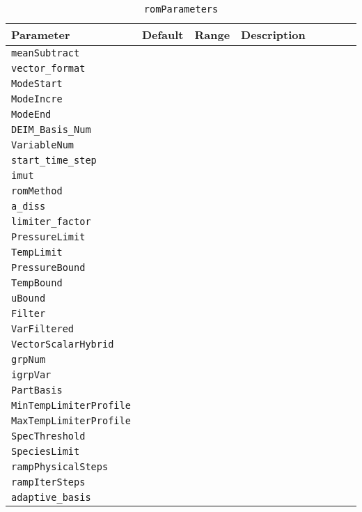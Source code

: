 \begin{table}[H]
    \centering
    \begin{tabular}{p{0.2\linewidth} p{0.1\linewidth} p{0.1\linewidth} p{0.6\linewidth}}
        \toprule
        Parameter & Default & Range & Description \\
        \midrule
        \verb|meanSubtract| &  &  &  \\
        \verb|vector_format| &  &  &  \\
        \verb|ModeStart| &  &  &  \\
        \verb|ModeIncre| &  &  &  \\
        \verb|ModeEnd| &  &  &  \\
        \verb|DEIM_Basis_Num| &  &  &  \\
        \verb|VariableNum| &  &  &  \\
        \verb|start_time_step| &  &  &  \\
        \verb|imut| &  &  &  \\
        \verb|romMethod| &  &  &  \\
        \verb|a_diss| &  &  &  \\
        \verb|limiter_factor| &  &  &  \\
        \verb|PressureLimit| &  &  &  \\
        \verb|TempLimit| &  &  &  \\
        \verb|PressureBound| &  &  &  \\
        \verb|TempBound| &  &  &  \\
        \verb|uBound| &  &  &  \\
        \verb|Filter| &  &  &  \\
        \verb|VarFiltered| &  &  &  \\
        \verb|VectorScalarHybrid| &  &  &  \\
        \verb|grpNum| &  &  &  \\
        \verb|igrpVar| &  &  &  \\
        \verb|PartBasis| &  &  &  \\
        \verb|MinTempLimiterProfile| &  &  &  \\
        \verb|MaxTempLimiterProfile| &  &  &  \\
        \verb|SpecThreshold| &  &  &  \\
        \verb|SpeciesLimit| &  &  &  \\
        \verb|rampPhysicalSteps| &  &  &  \\
        \verb|rampIterSteps| &  &  &  \\
        \verb|adaptive_basis| &  &  &  \\
        \bottomrule 
    \end{tabular}
    \caption{\texttt{romParameters}}
\end{table}

